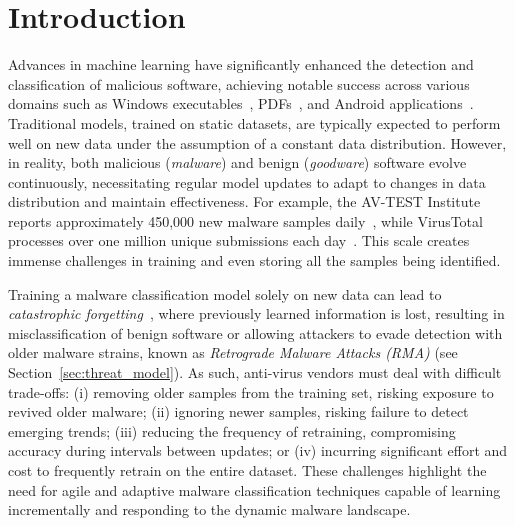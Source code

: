 \section{Introduction}


Advances in machine learning have significantly enhanced the detection and classification of malicious software, achieving notable success across various domains such as Windows executables~\cite{malwareguard, transcendingtranscend, chen2023continuous}, PDFs~\cite{maiorca2012pattern}, and Android applications~\cite{arp2014drebin, cade}. Traditional models, trained on static datasets, are typically expected to perform well on new data under the assumption of a constant data distribution. However, in reality, both malicious (\emph{malware}) and benign (\emph{goodware}) software evolve continuously, necessitating regular model updates to adapt to changes in data distribution and maintain effectiveness. For example, the AV-TEST Institute reports approximately 450,000 new malware samples daily~\cite{av-test}, while VirusTotal processes over one million unique submissions each day~\cite{virustotal}. This scale creates immense challenges in training and even storing all the samples being identified.

Training a malware classification model solely on new data can lead to \emph{catastrophic forgetting}~\cite{french1999catastrophic, robins1995catastrophic}, where previously learned information is lost, resulting in misclassification of benign software or allowing attackers to evade detection with older malware strains, known as {\em Retrograde Malware Attacks (RMA)} (see Section~\ref{sec:threat_model}). %
As such, anti-virus vendors must deal with difficult trade-offs: (i) removing older samples from the training set, risking exposure to revived older malware; (ii) ignoring newer samples, risking failure to detect emerging trends; (iii) reducing the frequency of retraining, compromising accuracy during intervals between updates; or (iv) incurring significant effort and cost to frequently retrain on the entire dataset. These challenges highlight the need for agile and adaptive malware classification techniques capable of learning incrementally and responding to the dynamic malware landscape.

